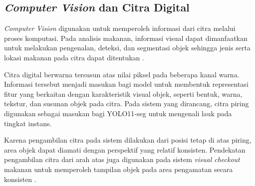 \subsection{\textit{Computer Vision} dan Citra Digital}

\textit{Computer Vision} digunakan untuk memperoleh informasi dari citra melalui proses komputasi. Pada analisis makanan, informasi visual dapat dimanfaatkan untuk melakukan pengenalan, deteksi, dan segmentasi objek sehingga jenis serta lokasi makanan pada citra dapat ditentukan \cite{aguilar2017}.

Citra digital berwarna tersusun atas nilai piksel pada beberapa kanal warna. Informasi tersebut menjadi masukan bagi model untuk membentuk representasi fitur yang berkaitan dengan karakteristik visual objek, seperti bentuk, warna, tekstur, dan susunan objek pada citra. Pada sistem yang dirancang, citra piring digunakan sebagai masukan bagi YOLO11-seg untuk mengenali lauk pada tingkat instans.

Karena pengambilan citra pada sistem dilakukan dari posisi tetap di atas piring, area objek dapat diamati dengan perspektif yang relatif konsisten. Pendekatan pengambilan citra dari arah atas juga digunakan pada sistem \textit{visual checkout} makanan untuk memperoleh tampilan objek pada area pengamatan secara konsisten \cite{wu2021}.
